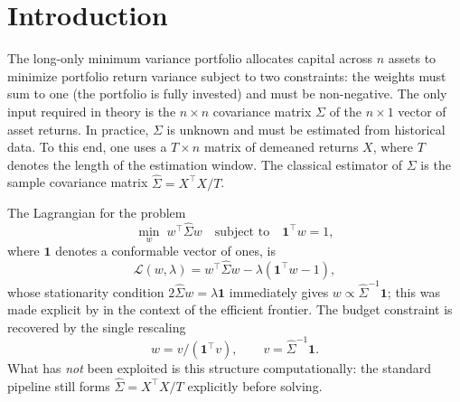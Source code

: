 \section{Introduction}

The long-only minimum variance portfolio allocates capital across $n$ assets to minimize
portfolio return variance subject to two constraints: the weights must sum to one (the
portfolio is fully invested) and must be non-negative. The only input required in theory
is the $n \times n$ covariance matrix $\Sigma$ of the $n \times 1$ vector of asset
returns. In practice, $\Sigma$ is unknown and must be estimated from historical data.
To this end, one uses a $T\times n$ matrix of demeaned returns $X$, where $T$ denotes
the length of the estimation window. The classical estimator of $\Sigma$ is the sample
covariance matrix $\hat \Sigma = X^\top X/T$.

The Lagrangian for the problem
\[
\min_w\; w^\top \hat \Sigma w \quad \text{subject to} \quad \mathbf{1}^\top w = 1,
\]
where $\mathbf{1}$ denotes a conformable vector of ones, is
\[
\mathcal{L}(w,\lambda) = w^\top \hat \Sigma w - \lambda(\mathbf{1}^\top w - 1),
\]
whose stationarity condition $2 \hat \Sigma w = \lambda\mathbf{1}$ immediately gives
$w \propto \hat \Sigma^{-1}\mathbf{1}$; this was made explicit by \cite{merton1972} in
the context of the efficient frontier. The budget constraint is recovered by the single
rescaling
\[
w = v/(\mathbf{1}^\top v), \qquad v = \hat \Sigma^{-1}\mathbf{1}.
\]
What has \emph{not} been exploited is this structure computationally: the standard
pipeline still forms $\hat \Sigma = X^\top X/T$ explicitly before solving.

